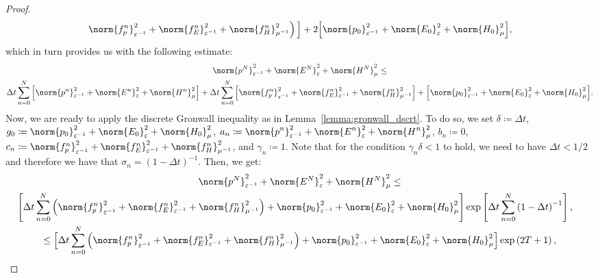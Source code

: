 \documentclass{amsart}
\theoremstyle{thmstyleone}%
\theoremstyle{thmstyletwo}%
\theoremstyle{thmstylethree}%
\begin{document}
\begin{proof}
\begin{multline*}
  \left. \norm{f_p^n}^2_{\varepsilon^{-1}} + \norm{f_E^n}^2_{\varepsilon^{-1}} + \norm{f_H^n}^2_{\mu^{-1}} \right) \Big] + 2 \Big[ \norm{p_0}^2_{\varepsilon^{-1}} + \norm{E_0}^2_{\varepsilon} + \norm{H_0}^2_{\mu} \Big],
\end{multline*}
which in turn provides us with the following estimate:
\begin{multline*}
  \norm{p^N}^2_{\varepsilon^{-1}} + \norm{E^N}^2_{\varepsilon} + \norm{H^N}^2_{\mu} \le \\
  \Delta t \sum\limits_{n = 0}^{N} \Big[ \norm{p^n}^2_{\varepsilon^{-1}} +\norm{E^n}^2_{\varepsilon} + \norm{H^n}^2_{\mu} \Big] + \Delta t \sum\limits_{n = 0}^{N} \Big[ \norm{f_p^n}^2_{\varepsilon^{-1}} + \norm{f_E^n}^2_{\varepsilon^{-1}} + \norm{f_H^n}^2_{\mu^{-1}}\Big] + \Big[ \norm{p_0}^2_{\varepsilon^{-1}} + \norm{E_0}^2_{\varepsilon} + \norm{H_0}^2_{\mu} \Big].
\end{multline*}
Now, we are ready to apply the discrete Gronwall inequality as in Lemma~\ref{lemma:gronwall_dscrt}. To do so, we set $\displaystyle \delta \coloneq \Delta t$, $\displaystyle g_0 \coloneq \norm{p_0}^2_{\varepsilon^{-1}} + \norm{E_0}^2_{\varepsilon} + \norm{H_0}^2_{\mu}$, $\displaystyle a_n \coloneq \norm{p^n}^2_{\varepsilon^{-1}} + \norm{E^n}^2_{\varepsilon} + \norm{H^n}^2_{\mu}$, $\displaystyle b_n \coloneq 0$, $c_n \coloneq \norm{f_p^n}^2_{\varepsilon^{-1}} + \norm{f_E^n}^2_{\varepsilon^{-1}} + \norm{f_H^n}^2_{\mu^{-1}}$, and $\displaystyle \gamma_n \coloneq 1$. Note that for the condition $\gamma_n \delta < 1$ to hold, we need to have $\Delta t < 1/2$ and therefore we have that $\sigma_n = \left(1 - \Delta t \right)^{-1}$. Then, we get:
\begin{multline*}
  \norm{p^N}^2_{\varepsilon^{-1}} + \norm{E^N}^2_{\varepsilon} + \norm{H^N}^2_{\mu} \le \\
  \shoveright{\Bigg[ \Delta t \sum\limits_{n = 0}^{N} \left( \norm{f_p^n}^2_{\varepsilon^{-1}} + \norm{f_E^n}^2_{\varepsilon^{-1}} + \norm{f_H^n}^2_{\mu^{-1}} \right) + \norm{p_0}^2_{\varepsilon^{-1}} + \norm{E_0}^2_{\varepsilon} + \norm{H_0}^2_{\mu}\Bigg] \exp \left[ \Delta t \sum\limits_{n = 0}^{N} \left( 1 - \Delta t \right)^{-1} \right],} \\
  \le \Big[ \Delta t \sum\limits_{n = 0}^{N} \left( \norm{f_p^n}^2_{\varepsilon^{-1}} + \norm{f_E^n}^2_{\varepsilon^{-1}} + \norm{f_H^n}^2_{\mu^{-1}}\right) + \norm{p_0}^2_{\varepsilon^{-1}} + \norm{E_0}^2_{\varepsilon} + \norm{H_0}^2_{\mu}\Big] \exp\left( 2 T + 1 \right),
\end{multline*}

\end{proof}
\end{document}
